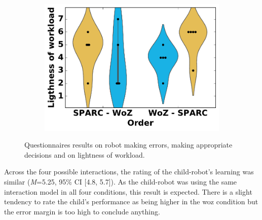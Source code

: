 \begin{figure}[ht]
\begin{subfigure}[t]{0.341\textwidth}
	\end{subfigure}%
	~ 
	\begin{subfigure}[t]{0.3295\textwidth}
		\centering
		\includegraphics[width=1.\textwidth]{workload.pdf}
	\end{subfigure}
	\caption{Questionnaires results on robot making errors, making appropriate decisions and on lightness of workload.}
	\label{fig:woz_quest}
\end{figure}

Across the four possible interactions, the rating of the child-robot's learning was similar (\textit{M}=5.25, 95\% CI [4.8, 5.7]). As the child-robot was using the same interaction model in all four conditions, this result is expected. There is a slight tendency to rate the child's performance as being higher in the \gls{woz} condition but the error margin is too high to conclude anything. %

